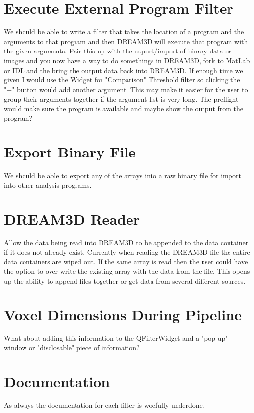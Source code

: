 \documentclass[12pt]{article} %
\begin{document}
\section{Execute External Program Filter}
	We should be able to write a filter that takes the location of a program and the arguments to that program and then DREAM3D will execute that program with the given arguments. Pair this up with the export/import of binary data or images and you now have a way to do somethings in DREAM3D, fork to MatLab or IDL and the bring the output data back into DREAM3D. If enough time we given I would use the Widget for "Comparison" Threshold filter so clicking the "+" button would add another argument. This may make it easier for the user to group their arguments together if the argument list is very long. The preflight would make sure the program is available and maybe show the output from the program?

\section{Export Binary File}
  We should be able to export any of the arrays into a raw binary file for import into other analysis programs. 
  
\section{DREAM3D Reader}
 Allow the data being read into DREAM3D to be appended to the data container if it does not already exist. Currently when reading the DREAM3D file the entire data containers are wiped out. If the same array is read then the user could have the option to over write the existing array with the data from the file. This opens up the ability to append files together or get data from several different sources.   
   
\section{Voxel Dimensions During Pipeline}
What about adding this information to the QFilterWidget and a "pop-up" window or "disclosable" piece of information?

\section{Documentation}
  As always the documentation for each filter is woefully underdone.
  
\end{document}
